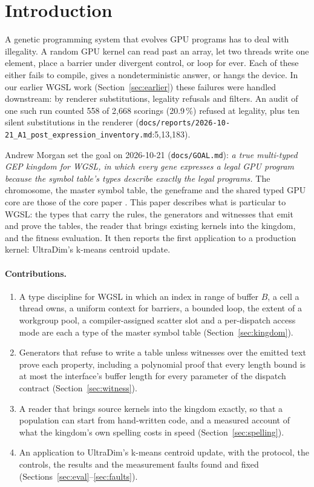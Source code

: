 \documentclass[sigconf,nonacm]{acmart}
\newcommand{\src}[1]{{\footnotesize\nolinkurl{#1}}}
\begin{document}
\section{Introduction}

A genetic programming system that evolves GPU programs has to deal with
illegality. A random GPU kernel can read past an array, let two threads write
one element, place a barrier under divergent control, or loop for ever. Each of
these either fails to compile, gives a nondeterministic answer, or hangs the
device. In our earlier WGSL work (Section~\ref{sec:earlier}) these failures
were handled downstream: by renderer substitutions, legality refusals and
filters. An audit of one such run counted 558 of 2,668 scorings (20.9\,\%)
refused at legality, plus ten silent substitutions in the renderer
(\src{docs/reports/2026-10-21_A1_post_expression_inventory.md}:5,13,183).

Andrew Morgan set the goal on 2026-10-21 (\src{docs/GOAL.md}): \emph{a true
multi-typed GEP kingdom for WGSL, in which every gene expresses a legal GPU
program because the symbol table's types describe exactly the legal programs.}
The chromosome, the master symbol table, the geneframe and the shared typed
GPU core are those of the core paper \cite{morgan_core}. This paper describes
what is particular to WGSL: the types that carry the rules, the generators
and witnesses that emit and prove the tables, the reader that brings existing
kernels into the kingdom, and the fitness evaluation. It then reports the first
application to a production kernel: UltraDim's k-means centroid update.

\paragraph{Contributions.}
\begin{enumerate}
\item A type discipline for WGSL in which an index in range of buffer $B$, a
  cell a thread owns, a uniform context for barriers, a bounded loop, the extent
  of a workgroup pool, a compiler-assigned scatter slot and a per-dispatch
  access mode are each a type of the master symbol table
  (Section~\ref{sec:kingdom}).
\item Generators that refuse to write a table unless witnesses over the
  emitted text prove each property, including a polynomial proof that every
  length bound is at most the interface's buffer length for every parameter of
  the dispatch contract (Section~\ref{sec:witness}).
\item A reader that brings source kernels into the kingdom exactly, so that a
  population can start from hand-written code, and a measured account of what
  the kingdom's own spelling costs in speed (Section~\ref{sec:spelling}).
\item An application to UltraDim's k-means centroid update, with the protocol,
  the controls, the results and the measurement faults found and fixed
  (Sections~\ref{sec:eval}--\ref{sec:faults}).
\end{enumerate}
\end{document}
